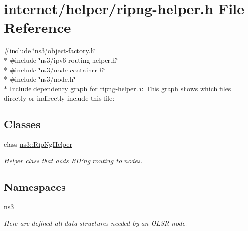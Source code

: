 \hypertarget{ripng-helper_8h}{}\section{internet/helper/ripng-\/helper.h File Reference}
\label{ripng-helper_8h}
{\ttfamily \#include \char`\"{}ns3/object-\/factory.\+h\char`\"{}}\\*
{\ttfamily \#include \char`\"{}ns3/ipv6-\/routing-\/helper.\+h\char`\"{}}\\*
{\ttfamily \#include \char`\"{}ns3/node-\/container.\+h\char`\"{}}\\*
{\ttfamily \#include \char`\"{}ns3/node.\+h\char`\"{}}\\*
Include dependency graph for ripng-\/helper.h\+:
This graph shows which files directly or indirectly include this file\+:
\subsection*{Classes}
\begin{DoxyCompactItemize}
\item 
class \hyperlink{classns3_1_1RipNgHelper}{ns3\+::\+Rip\+Ng\+Helper}
\begin{DoxyCompactList}\small\item\em Helper class that adds R\+I\+Png routing to nodes. \end{DoxyCompactList}\end{DoxyCompactItemize}
\subsection*{Namespaces}
\begin{DoxyCompactItemize}
\item 
 \hyperlink{namespacens3}{ns3}
\begin{DoxyCompactList}\small\item\em Here are defined all data structures needed by an O\+L\+SR node. \end{DoxyCompactList}\end{DoxyCompactItemize}
